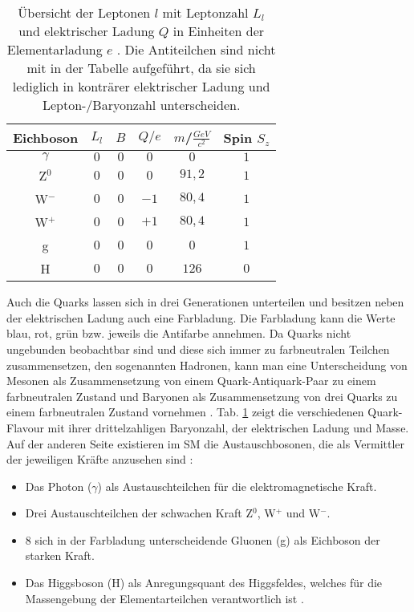 \begin{table}[htbp]
\begin{tabular*}{\linewidth}{@{\extracolsep{\fill}}cccccc}
		\\
		\hline
		\rule[-7pt]{0pt}{23pt} Eichboson & \(L_l\) & $B$ & $Q/e$ & $m$/$\frac{GeV}{c^2}$ & Spin $S_z$
		\\
		\hline
		\rule[-6pt]{0pt}{21pt} $\gamma$ &  $0$	& $0$ & $0$ & $0$ & $1$
		\\
		\rule[-6pt]{0pt}{21pt} Z$^0$ &  $0$	& $0$ & $0$ & $91,2$ & $1$
		\\
		\rule[-6pt]{0pt}{21pt} W$^-$ &  $0$	& $0$ & $-1$ & $80,4$ & $1$
		\\
		\rule[-6pt]{0pt}{21pt} W$^+$ &  $0$	& $0$ & $+1$ & $80,4$ & $1$
		\\
		\rule[-6pt]{0pt}{21pt} g &  $0$	& $0$ & $0$ & $0$ & $1$
		\\
		\rule[-6pt]{0pt}{21pt} H &  $0$	& $0$ & $0$ & $126$ & $0$
		\\
		\hline
		\hline
		\end{tabular*}
		\caption[Eine Übersicht von Elementarteilchen mit einer Auswahl an Eigenschaften]{Übersicht der Leptonen $l$ mit Leptonzahl $L_l$ und elektrischer Ladung $Q$ in Einheiten der Elementarladung $e$ \cite{Perkins}\cite{PDGPhysRev}. Die Antiteilchen sind nicht mit in der Tabelle aufgeführt, da sie sich lediglich in konträrer elektrischer Ladung und Lepton-/Baryonzahl unterscheiden.}
		\label{SMParticles}
	\end{table}
Auch die Quarks lassen sich in drei Generationen unterteilen und besitzen neben der elektrischen Ladung auch eine Farbladung. Die Farbladung kann die Werte blau, rot, grün bzw. jeweils die Antifarbe annehmen. Da Quarks nicht ungebunden beobachtbar sind und diese sich immer zu farbneutralen Teilchen zusammensetzen, den sogenannten Hadronen, kann man eine Unterscheidung von Mesonen als Zusammensetzung von einem Quark-Antiquark-Paar zu einem farbneutralen Zustand und Baryonen als Zusammensetzung von drei Quarks zu einem farbneutralen Zustand vornehmen \cite{Cottingham}. Tab. \ref{SMParticles} zeigt die verschiedenen Quark-Flavour mit ihrer drittelzahligen Baryonzahl, der elektrischen Ladung und Masse.\\
Auf der anderen Seite existieren im SM die Austauschbosonen, die als Vermittler der jeweiligen Kräfte anzusehen sind \cite{Perkins}:
\begin{itemize}
    \item Das Photon ($\gamma$) als Austauschteilchen für die elektromagnetische Kraft.
    \item Drei Austauschteilchen der schwachen Kraft Z$^0$, W$^+$ und W$^-$.
    \item $8$ sich in der Farbladung unterscheidende Gluonen (g) als Eichboson der starken Kraft.
    \item Das Higgsboson (H) als Anregungsquant des Higgsfeldes, welches für die Massengebung der Elementarteilchen verantwortlich ist \cite{HiggsMechanismus}.
\end{itemize}

